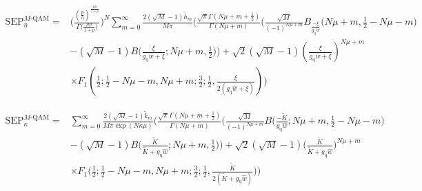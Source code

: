 \documentclass[journal,twocolumn]{IEEEtran}
\begin{document}
\begin{figure*}[t]
\setcounter{equation}{59}
\begin{align}
     \textrm{SEP}^{M\textrm{-QAM}}_{\eta} = \ & \Bigg( \frac{\left(\frac{p}{\eta }\right)^{\frac{\mu  p}{1+p}}}{\Gamma \big(\frac{\mu  p}{1+p}\big)} \Bigg)^{N  } \sum _{m=0}^{\infty} \frac{2 (\sqrt{M}-1) \tilde{h}_m}{M \pi } \Bigg( \frac{\sqrt{\pi } \Gamma (N \mu + m +\frac{1}{2})}{\Gamma (N \mu + m )}\bigg(\frac{\sqrt{M}}{ (-1)^{N\mu + m}} B_{\frac{-\xi }{g_{\textrm{q}} \hat{w} }}\bigg(N\mu +m, \frac{1}{2}-N\mu-m\bigg) \nonumber \\
     &-(\sqrt{M}-1) B\bigg(\frac{\xi}{g_{\textrm{q}} \hat{w}+\xi};N \mu + m ,\frac{1}{2}\bigg)\bigg)+ \sqrt{2} (\sqrt{M}-1)\left(\frac{\xi}{g_{\textrm{q}} \hat{w}+\xi}\right)^{N\mu +m} \nonumber \\
     &\times F_1\left(\frac{1}{2};\frac{1}{2}-N\mu-m,N\mu + m;\frac{3}{2};\frac{1}{2},\frac{\xi}{2 \left(g_{\textrm{q}} \hat{w} +\xi\right)}\right)\Bigg) \label{eq:eta:qam-2}
\end{align}
\vspace{-1mm}
\hrulefill
\vspace{-1mm}
\end{figure*}
%
\begin{figure*}[t]
\setcounter{equation}{61}
\begin{align}
     \textrm{SEP}^{M\textrm{-QAM}}_{\kappa} = \ &  \sum _{m=0}^{\infty} \frac{2 (\sqrt{M}-1) \tilde{k}_m}{M \pi \exp(N\kappa\mu) } \Bigg( \frac{\sqrt{\pi } \Gamma (N \mu + m +\frac{1}{2})}{\Gamma (N \mu + m )}\bigg(\frac{\sqrt{M}}{ (-1)^{N\mu + m}} B\bigg({\frac{-\tilde{K} }{ g_{\textrm{q}} \hat{w}} };N\mu +m, \frac{1}{2}-N\mu-m\bigg) \nonumber \\
     &-(\sqrt{M}-1) B\bigg({\frac{\tilde{K} }{\tilde{K} +  g_{\textrm{q}} \hat{w}}};N \mu + m ,\frac{1}{2}\bigg)\bigg)+ \sqrt{2} (\sqrt{M}-1)\bigg(\frac{\tilde{K}}{
     \tilde{K} + g_{\textrm{q}} \hat{w}}\bigg)^{N\mu +m} \nonumber \\
     &\times F_1\bigg(\frac{1}{2};\frac{1}{2}-N\mu-m,N\mu + m;\frac{3}{2};\frac{1}{2},\frac{\tilde{K}}{2 ( \tilde{K} + g_{\textrm{q}} \hat{w})}\bigg)\Bigg) \label{eq:kappa:qam-2}
\end{align}
\setcounter{equation}{50}
\vspace{-1mm}
\hrulefill
\vspace{-1mm}
\end{figure*}

\smallskip
\end{document}
